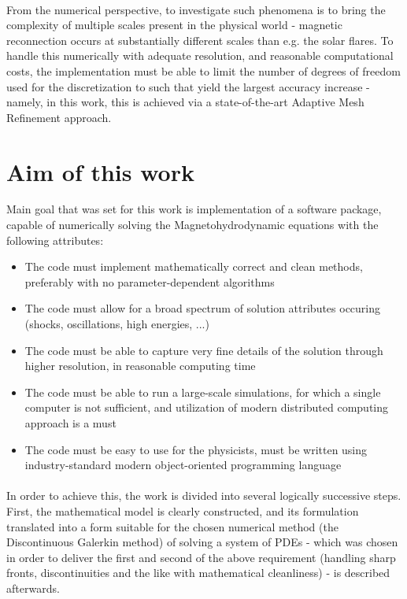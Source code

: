 \paragraph{}
From the numerical perspective, to investigate such phenomena is to bring the complexity of multiple scales present in the physical world - magnetic reconnection occurs at substantially different scales than e.g. the solar flares. To handle this numerically with adequate resolution, and reasonable computational costs, the implementation must be able to limit the number of degrees of freedom used for the discretization to such that yield the largest accuracy increase - namely, in this work, this is achieved via a state-of-the-art Adaptive Mesh Refinement approach.

\section{Aim of this work}
Main goal that was set for this work is implementation of a software package, capable of numerically solving the Magnetohydrodynamic equations with the following attributes:
\begin{itemize}
	\item The code must implement mathematically correct and clean methods, preferably with no parameter-dependent algorithms
	\item The code must allow for a broad spectrum of solution attributes occuring (shocks, oscillations, high energies, ...)
	\item The code must be able to capture very fine details of the solution through higher resolution, in reasonable computing time
	\item The code must be able to run a large-scale simulations, for which a single computer is not sufficient, and utilization of modern distributed computing approach is a must
	\item The code must be easy to use for the physicists, must be written using industry-standard modern object-oriented programming language
\end{itemize}
\paragraph{}
In order to achieve this, the work is divided into several logically successive steps. First, the mathematical model is clearly constructed, and its formulation translated into a form suitable for the chosen numerical method (the Discontinuous Galerkin method) of solving a system of PDEs - which was chosen in order to deliver the first and second of the above requirement (handling sharp fronts, discontinuities and the like with mathematical cleanliness) - is described afterwards.
